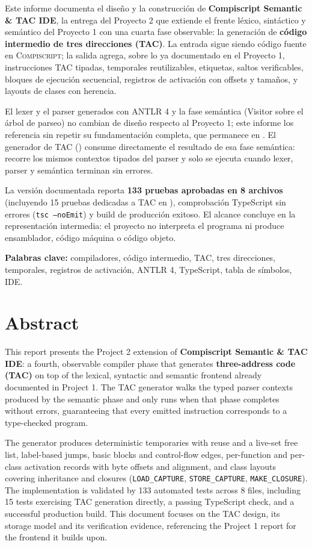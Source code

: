 \documentclass[11pt,letterpaper,oneside]{report}
\newcommand{\archivo}[1]{\path{#1}}
\newcommand{\codigo}[1]{\texttt{#1}}
\newcommand{\Compiscript}{\textsc{Compiscript}}
\newcommand{\ANTLR}{ANTLR 4}
\begin{document}
Este informe documenta el diseño y la construcción de
\textbf{Compiscript Semantic \& TAC IDE}, la entrega del Proyecto 2 que extiende el
frente léxico, sintáctico y semántico del Proyecto 1 con una cuarta fase observable:
la generación de \textbf{código intermedio de tres direcciones (TAC)}. La entrada
sigue siendo código fuente en \Compiscript{}; la salida agrega, sobre lo ya
documentado en el Proyecto 1, instrucciones TAC tipadas, temporales reutilizables,
etiquetas, saltos verificables, bloques de ejecución secuencial, registros de
activación con offsets y tamaños, y layouts de clases con herencia.

El lexer y el parser generados con \ANTLR{} y la fase semántica (Visitor sobre el
árbol de parseo) no cambian de diseño respecto al Proyecto 1; este informe los
referencia sin repetir su fundamentación completa, que permanece en
\archivo{INFORME\_PROYECTO\_01.tex}. El generador de TAC (\archivo{src/tac/}) consume
directamente el resultado de esa fase semántica: recorre los mismos contextos
tipados del parser y solo se ejecuta cuando lexer, parser y semántica terminan sin
errores.

La versión documentada reporta \textbf{133 pruebas aprobadas en 8 archivos}
(incluyendo 15 pruebas dedicadas a TAC en \archivo{tac.test.ts}), comprobación
TypeScript sin errores (\codigo{tsc --noEmit}) y build de producción exitoso. El alcance concluye en la representación
intermedia: el proyecto no interpreta el programa ni produce ensamblador, código
máquina o código objeto.

\textbf{Palabras clave:} compiladores, código intermedio, TAC, tres direcciones,
temporales, registros de activación, \ANTLR, TypeScript, tabla de símbolos, IDE.

\chapter*{Abstract}

This report presents the Project 2 extension of
\textbf{Compiscript Semantic \& TAC IDE}: a fourth, observable compiler phase that
generates \textbf{three-address code (TAC)} on top of the lexical, syntactic and
semantic frontend already documented in Project 1. The TAC generator walks the typed
parser contexts produced by the semantic phase and only runs when that phase
completes without errors, guaranteeing that every emitted instruction corresponds to
a type-checked program.

The generator produces deterministic temporaries with reuse and a live-set free
list, label-based jumps, basic blocks and control-flow edges, per-function and per-class
activation records with byte offsets and alignment, and class layouts covering
inheritance and closures (\codigo{LOAD\_CAPTURE}, \codigo{STORE\_CAPTURE},
\codigo{MAKE\_CLOSURE}). The implementation is validated by 133 automated tests
across 8 files, including 15 tests exercising TAC generation directly, a passing
TypeScript check, and a successful production build. This document focuses on the
TAC design, its storage model and its verification evidence, referencing the
Project 1 report for the frontend it builds upon.
\end{document}

